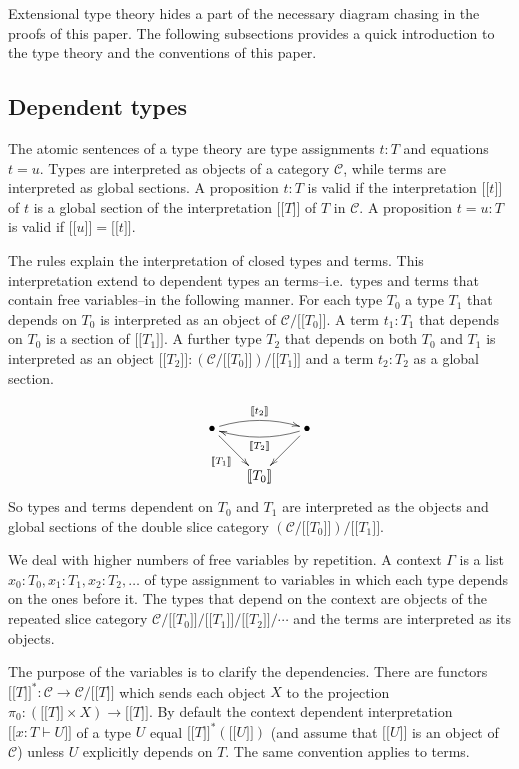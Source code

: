 \documentclass{tac}
\newcommand\hide[1]{}
\newcommand\cat\mathcal
\newcommand\ri{^*}
\newcommand\of{:}
\newcommand\db[1]{{[\![}#1{]\!]}}
\begin{document}
Extensional type theory hides a part of the necessary diagram chasing in the proofs of this paper. The following subsections provides a quick introduction to the type theory and the conventions of this paper.

\subsection{Dependent types}
The atomic sentences of a type theory are type assignments $t\of T$ and equations $t=u$. Types are interpreted as objects of a category $\cat C$, while terms are interpreted as global sections. A proposition $t\of T$ is valid if the interpretation $\db t$ of $t$ is a global section of the interpretation $\db T$ of $T$ in $\cat C$. A proposition $t=u\of T$ is valid if $\db u=\db t$. 

The rules explain the interpretation of closed types and terms. This interpretation extend to dependent types an terms--i.e.\ types and terms that contain free variables--in the following manner. For each type $T_0$ a type $T_1$ that depends on $T_0$ is interpreted as an object of $\cat C/\db{T_0}$. A term $t_1\of T_1$ that depends on $T_0$ is a section of $\db{T_1}$. A further type $T_2$ that depends on both $T_0$ and $T_1$ is interpreted as an object $\db{T_2}\of(\cat C/\db{T_0})/\db{T_1}$ and a term $t_2\of T_2$ as a global section.
\hide{\[\xymatrix{
& \bullet\ar[dl]^{\db{T_2}}\ar[d]\\ 
\bullet\ar[r]_{\db{T_1}}\ar@/^/[ur]^{\db{t_2}} & \db{T_0}
}\]}
\[\xy
(0,12)*+{\bullet} = "top left",(24,12)*+{\bullet} = "top right",(12,0)*+{\db{T_0}} = "bottom"
\ar "top right";"bottom" \ar_{\db{T_1}} "top left";"bottom" 
\ar@/^/@{->}^{\db{T_2}} "top right";"top left"
\ar@/^/@{->}^{\db{t_2}} "top left";"top right"
\endxy\]
So types and terms dependent on $T_0$ and $T_1$ are interpreted as the objects and global sections of the double slice category $(\cat C/\db{T_0})/\db{T_1}$.

We deal with higher numbers of free variables by repetition. A context $\Gamma$ is a list $x_0\of T_0,x_1\of T_1,x_2\of T_2,\dots$ of type assignment to variables in which each type depends on the ones before it. The types that depend on the context are objects of the repeated slice category $\cat C/\db{T_0}/\db{T_1}/\db{T_2}/\dotsm$ and the terms are interpreted as its objects. 

The purpose of the variables is to clarify the dependencies. There are functors $\db T\ri\of\cat C\to \cat C/\db T$ which sends each object $X$ to the projection $\pi_0\of(\db T\times X)\to \db T$. By default the context dependent interpretation $\db{x\of T\vdash U}$ of a type $U$ equal $\db T\ri(\db U)$ (and assume that $\db U$ is an object of $\cat C$) unless $U$ explicitly depends on $T$. The same convention applies to terms.
\end{document}
